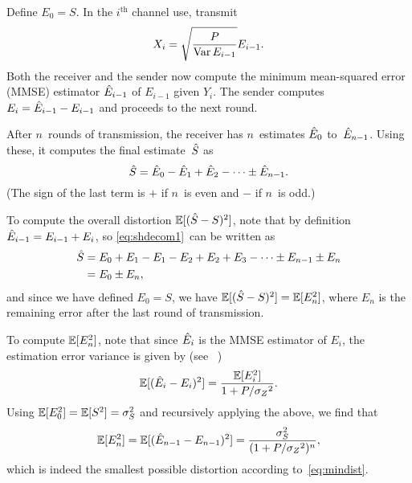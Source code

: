\begin{example}
  \label{ex:gaussfb}
  Define $E_0 = S$. In the $i^{\text{th}}$ channel use, transmit
  \begin{equation}
    \label{eq:gaussfbxi}
    X_i = \sqrt{\frac{P}{\operatorname{Var} E_{i-1}}} E_{i-1}.
  \end{equation}
  Both the receiver and the sender now compute the minimum mean-squared
  error (MMSE) estimator $\hat{E}_{i-1}$ of $E_{i-1}$ given $Y_i$. The sender
  computes $E_i = \hat{E}_{i-1} - E_{i-1}$ and proceeds to the next round.

  After $n$~rounds of transmission, the receiver has $n$~estimates $\hat{E}_0$
  to~$\hat{E}_{n-1}$. Using these, it computes the final estimate~${\hat{S}}$ as
  \begin{equation}
    \label{eq:shdecom1}
    {\hat{S}} = \hat{E}_0 - \hat{E}_1 + \hat{E}_2 - \cdots \pm \hat{E}_{n-1}.
  \end{equation}
  (The sign of the last term is $+$ if $n$~is even and $-$ if $n$~is odd.)

  To compute the overall distortion ${\mathbb{E}[({\hat{S}} - S)^2]}$, note that by definition $\hat{E}_{i-1} =
  E_{i-1} + E_i$, so \eqref{eq:shdecom1}~can be written as
  \begin{align*}
    {\hat{S}} &= E_0 + E_1 - E_1 - E_2 + E_2 + E_3 - \cdots \pm E_{n-1} \pm E_n \\
    &= E_0 \pm E_n,
  \end{align*}
  and since we have defined $E_0 = S$, we have ${\mathbb{E}[({\hat{S}} - S)^2]} = \mathbb{E}[E_n^2]$, where $E_n$
  is the remaining error after the last round of transmission.

  To compute $\mathbb{E}[E_n^2]$, note that since $\hat{E}_i$ is the MMSE estimator of
  $E_i$, the estimation error variance is given by (see
  \eg~\cite[Section~8.3]{Scharf1990})
  \begin{equation*}
    \mathbb{E}[(\hat{E}_i - E_i)^2] = \frac{\mathbb{E}[E_i^2]}{1 + P/{{\sigma_Z}^2}}.
  \end{equation*}
  Using $\mathbb{E}[E_0^2] = \mathbb{E}[S^2] = {\sigma_S^2}$ and recursively applying the above, we find
  that
  \begin{equation*}
    \mathbb{E}[E_n^2] = \mathbb{E}[(\hat{E}_{n-1} - E_{n-1})^2] = \frac{{\sigma_S^2}}{(1 + P/{{\sigma_Z}^2})^n},
  \end{equation*}
  which is indeed the smallest possible distortion according
  to~\eqref{eq:mindist}.
\end{example}


